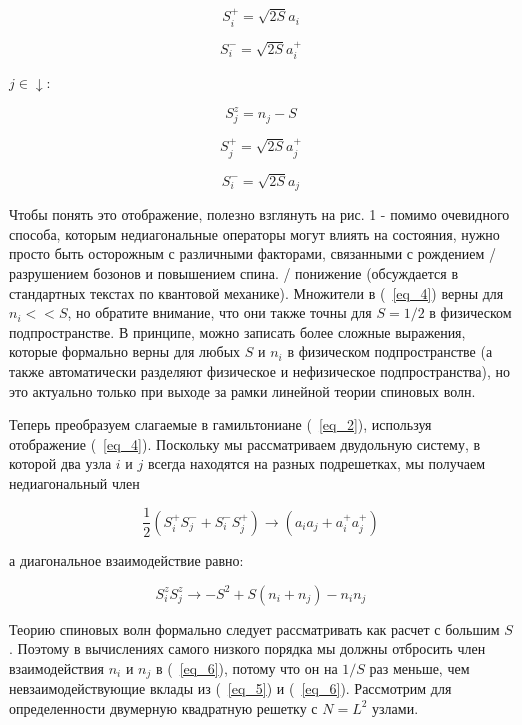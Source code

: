 \documentclass[11pt]{article}
\begin{document}
\begin{equation*}
S_i^{+}=\sqrt{2S}a_i 
\end{equation*}

\begin{equation*}
S_i^{-}=\sqrt{2S}a_i^{+} 
\end{equation*}


$j \in ↓$:

\begin{equation}
 S_j^z=n_j-S 
\label{eq_4}
\end{equation}

\begin{equation*}
S_j^{+}=\sqrt{2S}a_j^{+} 
\end{equation*}

\begin{equation*}
S_i^{-}=\sqrt{2S}a_j 
\end{equation*}

Чтобы понять это отображение, полезно взглянуть на рис. 1 - помимо очевидного способа, которым недиагональные операторы могут влиять на состояния, нужно просто быть осторожным с различными факторами, связанными с рождением / разрушением бозонов и повышением спина. / понижение (обсуждается в стандартных текстах по квантовой механике). Множители в (~\ref{eq_4}) верны для $n_i << S$, но обратите внимание, что они также точны для $S = 1/2$ в физическом подпространстве. В принципе, можно записать более сложные выражения, которые формально верны для любых $S$ и $n_i$ в физическом подпространстве (а также автоматически разделяют физическое и нефизическое подпространства), но это актуально только при выходе за рамки линейной теории спиновых волн.

Теперь преобразуем слагаемые в гамильтониане (~\ref{eq_2}), используя отображение (~\ref{eq_4}). Поскольку мы рассматриваем двудольную систему, в которой два узла $i$ и $j$ всегда находятся на разных подрешетках, мы получаем недиагональный член

\begin{equation}
\frac{1}{2}(S_i^{+}S_j^{-}+S_i^{-}S_j^{+}) \longrightarrow (a_ia_j+a_i^{+}a_j^{+})
\label{eq_5}
\end{equation}

а диагональное взаимодействие равно:

\begin{equation}
S_i^{z}S_j^{z} \longrightarrow -S^2+S(n_i+n_j)-n_in_j
\label{eq_6}
\end{equation}

Теорию спиновых волн формально следует рассматривать как расчет с большим $S$. Поэтому в вычислениях самого низкого порядка мы должны отбросить член взаимодействия $n_i$ и $n_j$ в (~\ref{eq_6}), потому что он на $1 / S$ раз меньше, чем невзаимодействующие вклады из (~\ref{eq_5}) и (~\ref{eq_6}). Рассмотрим для определенности двумерную квадратную решетку с $N = L^2$ узлами. 
\end{document}
